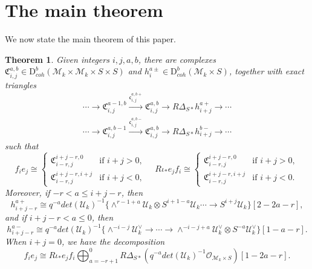 \documentclass{amsart}
\numberwithin{equation}{section}
\newcommand\mc{\mathcal}
\newcommand\mf{\mathfrak}
\newcommand{\D}{\mathrm{D}}
\newtheorem{theorem}{Theorem}[section]
\theoremstyle{definition}
\theoremstyle{remark}
\begin{document}
\section{The main theorem}
\label{sec6}
We now state the main theorem of this paper.
\begin{theorem}
  \label{thm61}
  Given integers $i,j,a,b$, there are complexes $\mf{C}_{i,j}^{a,b}\in \D^{b}_{coh}(\mc{M}_{k}\times \mc{M}_{k}\times S\times S)$ and $h_{i}^{a\pm}\in \D^{b}_{coh}(\mc{M}_{k}\times S)$, together with exact triangles
  \begin{align}
    \label{eq:exact1}
  \cdots \to \mf{C}_{i,j}^{a-1,b}\xrightarrow{\mf{c}_{i,j}^{a,b+}}\mf{C}_{i,j}^{a,b}\to R\Delta_{S*}h_{i+j}^{a+}\to \cdots \\
  \label{eq:exact2}
     \cdots \to \mf{C}_{i,j}^{a,b-1}\xrightarrow{\mf{c}_{i,j}^{a,b-}}\mf{C}_{i,j}^{a,b}\to R\Delta_{S*}h_{i+j}^{b-}\to \cdots
  \end{align}
  such that
  \begin{equation*}
      f_ie_j\cong \begin{cases}
        \mf{C}_{i-r,j}^{i+j-r,0} & \text{if } i+j>0, \\
        \mf{C}_{i-r,j}^{i+j-r,i+j} & \text{if } i+j<0,
              \end{cases} \quad 
      R\iota_{*}e_jf_i\cong \begin{cases}
        \mf{C}_{i-r,j}^{i+j-r,0} & \text{if } i+j>0, \\
        \mf{C}_{i-r,j}^{i+j-r,i+j} & \text{if } i+j<0.
              \end{cases}
  \end{equation*}
  Moreover, if $-r<a\leq i+j-r$, then
    \begin{equation}
    \label{eq:neq1}
    h_{i+j-r}^{a+}\cong q^{-a}det(\mc{U}_{k})^{-1}\{\wedge^{r-1+a}\mc{U}_{k}\otimes S^{i+1-a}\mc{U}_{k}\cdots \to S^{i+j}\mc{U}_{k}\}[2-2a-r],
  \end{equation}
  and if $i+j-r<a\leq 0$, then
  \begin{equation}
    \label{eq:neq2}
    h_{i+j-r}^{a-}\cong q^{-a}det(\mc{U}_{k})^{-1}\{\wedge^{-i-j}\mc{U}_{k}^{\vee}\to \cdots \to \wedge^{-i-j+a}\mc{U}_{k}^{\vee}\otimes S^{-a}\mc{U}_{k}^{\vee}\}[1-a-r]. 
  \end{equation}
  When $i+j=0$, we have the decomposition
    $$f_{i}e_{j}\cong R\iota_{*}e_{j}f_{i}\bigoplus_{a=-r+1}^{0} R\Delta_{S*}(q^{-a}det(\mc{U}_{k})^{-1}\mc{O}_{\mc{M}_{k}\times S})[1-2a-r].$$
\end{theorem}
\end{document}
